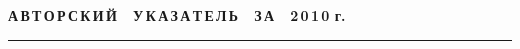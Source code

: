 \def\stat{cont}
{%
\raggedleft\Large \bf%
А\,В\,Т\,О\,Р\,С\,К\,И\,Й\ \ У\,К\,А\,З\,А\,Т\,Е\,Л\,Ь\ \ З\,А\ \ 2\,0\,1\,0 г. \vskip 17pt
    \hrule
    \par
{} }

\label{st\stat}

\def\tit{\ }

\def\aut{\ }
\def\auf{\ }

\def\leftkol{\ } %

\def\rightkol{\ } %

\titele{\tit}{\aut}{\auf}{\leftkol}{\rightkol}

\vspace*{-12pt}

